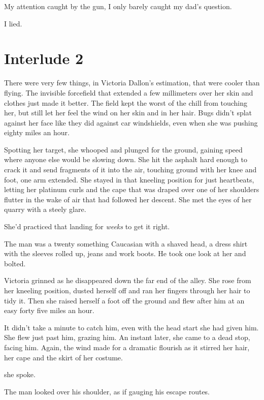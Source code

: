 My attention caught by the gun, I only barely caught my dad's question. 

 I lied.


\chapter{Interlude 2}

There were very few things, in Victoria Dallon's estimation, that were cooler than flying. The invisible forcefield that extended a few millimeters over her skin and clothes just made it better. The field kept the worst of the chill from touching her, but still let her feel the wind on her skin and in her hair. Bugs didn't splat against her face like they did against car windshields, even when she was pushing eighty miles an hour.

Spotting her target, she whooped and plunged for the ground, gaining speed where anyone else would be slowing down. She hit the asphalt hard enough to crack it and send fragments of it into the air, touching ground with her knee and foot, one arm extended. She stayed in that kneeling position for just heartbeats, letting her platinum curls and the cape that was draped over one of her shoulders flutter in the wake of air that had followed her descent. She met the eyes of her quarry with a steely glare.

She'd practiced that landing for {\em weeks} to get it right.

The man was a twenty something Caucasian with a shaved head, a dress shirt with the sleeves rolled up, jeans and work boots. He took one look at her and bolted.

Victoria grinned as he disappeared down the far end of the alley. She rose from her kneeling position, dusted herself off and ran her fingers through her hair to tidy it. Then she raised herself a foot off the ground and flew after him at an easy forty five miles an hour.

It didn't take a minute to catch him, even with the head start she had given him. She flew just past him, grazing him. An instant later, she came to a dead stop, facing him. Again, the wind made for a dramatic flourish as it stirred her hair, her cape and the skirt of her costume.

 she spoke.

The man looked over his shoulder, as if gauging his escape routes.

